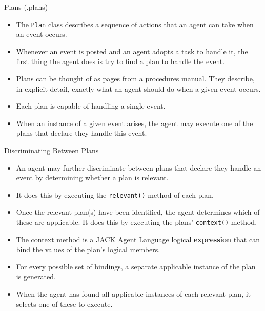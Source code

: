 \documentclass[aspectratio=1610,xcolor=dvipsnames,t]{beamer}
\begin{document}
\begin{frame}{Plans (.plans)} 
    \begin{itemize}
        \item The \texttt{Plan} class describes a sequence of actions that an 
              agent can take when an event occurs. 
        \item Whenever an event is posted and an agent adopts a 
              task to handle it, the first thing the agent does is 
              try to find a plan to handle the event.
        \item Plans can be thought of as pages from a procedures manual. 
              They describe, in explicit detail, exactly what an agent 
              should do when a given event occurs. 
        \item Each plan is capable of handling a single event. 
        \item When an instance of a given event arises, 
              the agent may execute one of the plans that 
              declare they handle this event. 
    \end{itemize} 
\end{frame} 

\begin{frame}{Discriminating Between Plans} 
    \begin{itemize}
        \item An agent may further discriminate between plans 
              that declare they handle an event by determining 
              whether a plan is relevant. 
        \item It does this by executing the \texttt{relevant()} method of each plan. 
        \item Once the relevant plan(s) have been identified, 
              the agent determines which of these are applicable. 
              It does this by executing the plans' \texttt{context()} method. 
          \item The context method is a JACK Agent Language logical \textbf{expression} 
              that can bind the values of the plan's logical members. 
        \item For every possible set of bindings, a separate applicable instance 
              of the plan is generated.
        \item When the agent has found all applicable instances of 
              each relevant plan, it selects one of these to execute.
    \end{itemize}
\end{frame}
\end{document}
